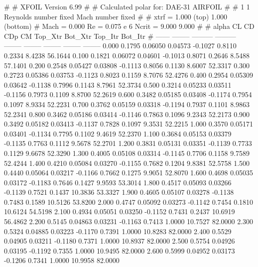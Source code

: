 #  
#       XFOIL         Version 6.99
#  
# Calculated polar for: DAE-31 AIRFOIL                                  
#  
# 1 1 Reynolds number fixed          Mach number fixed         
#  
# xtrf =   1.000 (top)        1.000 (bottom)  
# Mach =   0.000     Re =     0.075 e 6     Ncrit =   9.000  9.000
#  
#   alpha    CL        CD       CDp       CM     Top_Xtr  Bot_Xtr  Top_Itr  Bot_Itr
#  ------ -------- --------- --------- -------- -------- -------- -------- --------
   0.000   0.1795   0.06050   0.04573  -0.1027   0.8110   0.2334   8.4238  56.1644
   0.100   0.1821   0.06072   0.04601  -0.1013   0.8071   0.2646   8.5488  57.1401
   0.200   0.2548   0.05427   0.03808  -0.1113   0.8056   0.1130   8.6007  52.3317
   0.300   0.2723   0.05386   0.03753  -0.1123   0.8023   0.1159   8.7076  52.4276
   0.400   0.2954   0.05309   0.03642  -0.1138   0.7996   0.1143   8.7961  52.3734
   0.500   0.3214   0.05233   0.03511  -0.1156   0.7973   0.1109   8.8700  52.2619
   0.600   0.3482   0.05185   0.03408  -0.1174   0.7954   0.1097   8.9334  52.2231
   0.700   0.3762   0.05159   0.03318  -0.1194   0.7937   0.1101   8.9863  52.2341
   0.800   0.3462   0.05186   0.03414  -0.1146   0.7863   0.1096   9.2343  52.2173
   0.900   0.3492   0.05182   0.03413  -0.1137   0.7828   0.1097   9.3531  52.2215
   1.000   0.3570   0.05171   0.03401  -0.1134   0.7795   0.1102   9.4619  52.2370
   1.100   0.3684   0.05153   0.03379  -0.1135   0.7763   0.1112   9.5678  52.2701
   1.200   0.3831   0.05131   0.03351  -0.1139   0.7733   0.1129   9.6678  52.3290
   1.300   0.4005   0.05108   0.03314  -0.1145   0.7706   0.1158   9.7589  52.4244
   1.400   0.4210   0.05084   0.03270  -0.1155   0.7682   0.1204   9.8381  52.5758
   1.500   0.4440   0.05064   0.03217  -0.1166   0.7662   0.1275   9.9051  52.8070
   1.600   0.4698   0.05035   0.03172  -0.1183   0.7646   0.1427   9.9593  53.3014
   1.800   0.4517   0.05093   0.03266  -0.1139   0.7521   0.1437  10.3836  53.3327
   1.900   0.4605   0.05107   0.03278  -0.1138   0.7483   0.1589  10.5126  53.8200
   2.000   0.4747   0.05092   0.03273  -0.1142   0.7454   0.1810  10.6124  54.5198
   2.100   0.4934   0.05051   0.03250  -0.1152   0.7431   0.2437  10.6919  56.4862
   2.200   0.5145   0.04863   0.03231  -0.1163   0.7413   1.0000  10.7527  82.0000
   2.300   0.5324   0.04885   0.03223  -0.1170   0.7391   1.0000  10.8283  82.0000
   2.400   0.5529   0.04905   0.03211  -0.1180   0.7371   1.0000  10.8937  82.0000
   2.500   0.5754   0.04926   0.03195  -0.1192   0.7355   1.0000  10.9495  82.0000
   2.600   0.5999   0.04952   0.03173  -0.1206   0.7341   1.0000  10.9958  82.0000
